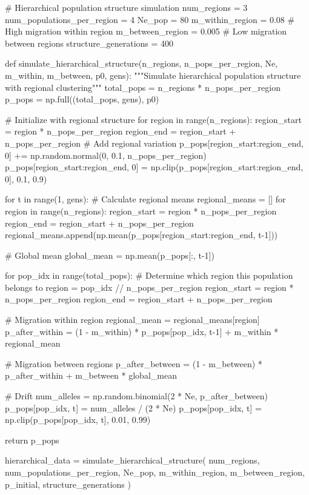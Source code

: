 \documentclass[11pt,a4paper]{article}
\begin{document}
\begin{pycode}
# Hierarchical population structure simulation
num_regions = 3
num_populations_per_region = 4
Ne_pop = 80
m_within_region = 0.08  # High migration within region
m_between_region = 0.005  # Low migration between regions
structure_generations = 400

def simulate_hierarchical_structure(n_regions, n_pops_per_region, Ne, m_within, m_between, p0, gens):
    """Simulate hierarchical population structure with regional clustering"""
    total_pops = n_regions * n_pops_per_region
    p_pops = np.full((total_pops, gens), p0)

    # Initialize with regional structure
    for region in range(n_regions):
        region_start = region * n_pops_per_region
        region_end = region_start + n_pops_per_region
        # Add regional variation
        p_pops[region_start:region_end, 0] += np.random.normal(0, 0.1, n_pops_per_region)
        p_pops[region_start:region_end, 0] = np.clip(p_pops[region_start:region_end, 0], 0.1, 0.9)

    for t in range(1, gens):
        # Calculate regional means
        regional_means = []
        for region in range(n_regions):
            region_start = region * n_pops_per_region
            region_end = region_start + n_pops_per_region
            regional_means.append(np.mean(p_pops[region_start:region_end, t-1]))

        # Global mean
        global_mean = np.mean(p_pops[:, t-1])

        for pop_idx in range(total_pops):
            # Determine which region this population belongs to
            region = pop_idx // n_pops_per_region
            region_start = region * n_pops_per_region
            region_end = region_start + n_pops_per_region

            # Migration within region
            regional_mean = regional_means[region]
            p_after_within = (1 - m_within) * p_pops[pop_idx, t-1] + m_within * regional_mean

            # Migration between regions
            p_after_between = (1 - m_between) * p_after_within + m_between * global_mean

            # Drift
            num_alleles = np.random.binomial(2 * Ne, p_after_between)
            p_pops[pop_idx, t] = num_alleles / (2 * Ne)
            p_pops[pop_idx, t] = np.clip(p_pops[pop_idx, t], 0.01, 0.99)

    return p_pops

hierarchical_data = simulate_hierarchical_structure(
    num_regions, num_populations_per_region, Ne_pop,
    m_within_region, m_between_region, p_initial, structure_generations
)


\end{pycode}
\end{document}
